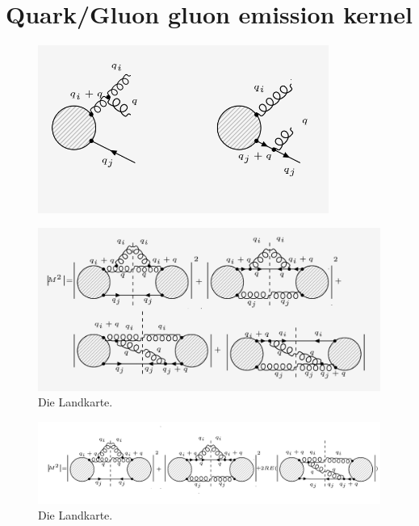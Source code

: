 \section{Quark/Gluon gluon emission kernel}

\begin{figure}[ht!]
\centering
\includegraphics[width=0.85\textwidth]{images/ggq-diagrams.png}
\end{figure}

\begin{figure}[ht!]
\centering
\includegraphics[width=1.0\textwidth]{images/ggq-MSquer.png}
\caption{Die Landkarte.}
\label{AERA}
\end{figure}

\begin{figure}[ht!]
\centering
\includegraphics[width=1.0\textwidth]{images/ggq-MSquerRE.png}
\caption{Die Landkarte.}
\label{AERA}
\end{figure}